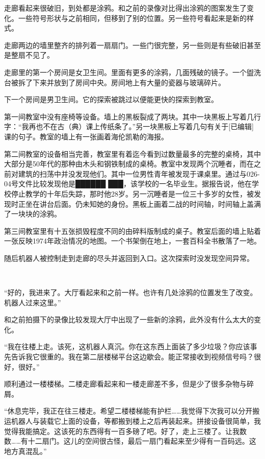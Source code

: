 走廊看起来很破旧，到处都是涂鸦。和之前的录像对比得出涂鸦的图案发生了变化。一些符号形状与之前相同，但移到了别的位置。另一些符号看起来是新的样式。

走廊两边的墙里整齐的排列着一扇扇门。一些门很完整，另一些则是有些破旧甚至是整扇不见了。

走廊里的第一个房间是女卫生间。里面有更多的涂鸦，几面残破的镜子。一个盥洗台被拆了下来并放到了房间中央。房间地上有大量的瓷器与玻璃碎片。

下一个房间是男卫生间。它的探索被跳过以便能更快的探索到教室。

第一间教室中没有座椅等设备。墙上的黑板裂成了两块。其中一块黑板上写着几行字：“我再也不在古（典）课上传纸条了。”另一块黑板上写着几句有关于{[}已编辑]课的句子。教室的墙上有一张画着海伦凯勒的海报。

第二间教室的设备相当完善，教室里有着迄今看到过数量最多的完整的桌椅，其中大部分是50年代的那种由木头和钢铁制成的桌椅。教室中发现两个沉睡者，而在之前对建筑的扫荡中并没发现他们。其中一位男性青年被发现于课桌里。通过与026-04号文件比较发现他是██████ ███，该学校的一名毕业生。据报告说，他在学校停止教学的十年后失踪，那时他28岁。另一沉睡者是一位三十多岁的女性，被发现时正坐在讲台后面。仍未知她的身份。黑板上画着二战的时间轴，时间轴上盖满了一块块的涂鸦。

第三间教室里有十五张损毁程度不同的由碎料版制成的桌子。教室后面的墙上贴着一张反映1974年政治情况的地图。一个书架倒在地上，一套百科全书散落了一地。

随后机器人被控制走到走廊的尽头并返回到入口。这次探索时没发现空间异常。

\\

“好的，我进来了。大厅看起来和之前一样。也许有几处涂鸦的位置发生了改变。机器人过来这里。”

和之前拍摄下的录像比较发现大厅中出现了一些新的涂鸦，此外没有什么太大的变化。

“我在往楼上走。该死，这机器人真沉。你在这东西上面装了多少垃圾？你应该事先告诉我它很重的。我在第二层楼梯平台这边歇会。能正常接收到视频信号吗？很好，很好。”

顺利通过一楼楼梯。二楼走廊看起来和一楼走廊差不多，但是少了很多杂物与碎屑。

“休息完毕，我正在往三楼走。希望二楼楼梯能有护栏……我觉得下次我可以分开搬运机器人与装载它上面的设备，等都搬到楼上之后再装起来。拼接设备很简单，我觉得我能搞定。这该死的东西得有一百多磅了吧。好了，走上三楼了。让我数数……有十二扇门。这儿的空间很古怪，最后一扇门看起来至少得有一百码远。这地方真混乱。”

